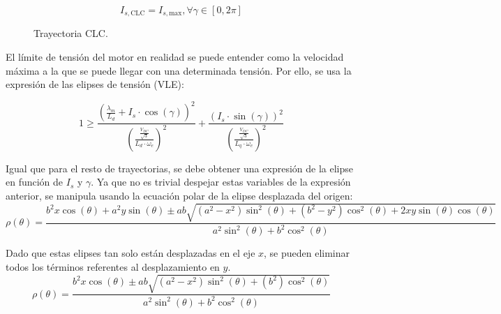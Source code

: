 \[
I_{s,\text{CLC}} = I_{s,\text{max}} , \forall \gamma \in [0,2\pi]
\]



\begin{figure}[H]
  \centering
  \caption{Trayectoria CLC.}
\end{figure}


El límite de tensión del motor en realidad se puede entender como la velocidad máxima a la que se puede llegar con una determinada tensión. Por ello, se usa la expresión de las elipses de tensión (VLE):

\begin{equation}
1 \geq \frac{\left(\frac{\lambda_m}{L_d}+I_s \cdot \cos(\gamma)\right)^2}{\left(\frac{\frac{V_{DC}}{\sqrt{3}}}{L_d\cdot\omega_e}\right)^2}+\frac{(I_s \cdot \sin(\gamma))^2}{\left(\frac{\frac{V_{DC}}{\sqrt{3}}}{L_q\cdot\omega_e}\right)^2}
\end{equation}

Igual que para el resto de trayectorias, se debe obtener una expresión de la elipse en función de $I_s$ y $\gamma$. Ya que no es trivial despejar estas variables de la expresión anterior, se manipula usando la ecuación polar de la elipse desplazada del origen:
\begin{equation}
\rho(\theta) = \frac{b^2 x \cos (\theta ) + a^2 y \sin (\theta )\pm a b \sqrt{\left(a^2-x^2\right) \sin ^2(\theta )+\left(b^2-y^2\right) \cos ^2(\theta )+2 x y \sin (\theta ) \cos (\theta )}}{a^2 \sin ^2(\theta )+b^2 \cos ^2(\theta )}
\end{equation}

Dado que estas elipses tan solo están desplazadas en el eje $x$, se pueden eliminar todos los términos referentes al desplazamiento en $y$.
\begin{equation}
\rho(\theta) = \frac{b^2 x \cos (\theta ) \pm a b \sqrt{\left(a^2-x^2\right) \sin ^2(\theta )+\left(b^2\right) \cos ^2(\theta )}}{a^2 \sin ^2(\theta )+b^2 \cos ^2(\theta )}
\end{equation}

